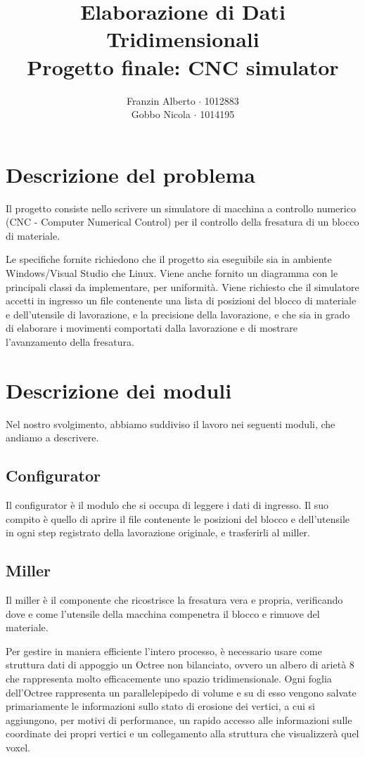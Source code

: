 \documentclass[10pt,a4paper,twoside,openright,titlepage,fleqn,%
               headinclude,,footinclude,BCOR5mm,%
               numbers=noenddot,cleardoublepage=empty,%
               tablecaptionabove]{scrreprt}
\title{Elaborazione di Dati Tridimensionali\\
Progetto finale: CNC simulator}
\author{Franzin Alberto $\cdot$ 1012883\\Gobbo Nicola $\cdot$ 1014195}
\begin{document}
\maketitle

\section{Descrizione del problema}
Il progetto consiste nello scrivere un simulatore di macchina a controllo numerico (CNC - Computer Numerical Control) per il controllo della fresatura di un blocco di materiale.

Le specifiche fornite richiedono che il progetto sia eseguibile sia in ambiente Windows/Visual Studio che Linux. Viene anche fornito un diagramma con le principali classi da implementare, per uniformità. Viene richiesto che il simulatore accetti in ingresso un file contenente una lista di posizioni del blocco di materiale e dell'utensile di lavorazione, e la precisione della lavorazione, e che sia in grado di elaborare i movimenti comportati dalla lavorazione e di mostrare l'avanzamento della fresatura.

\section{Descrizione dei moduli}
Nel nostro svolgimento, abbiamo suddiviso il lavoro nei seguenti moduli, che andiamo a descrivere.

\subsection{Configurator}
Il configurator è il modulo che si occupa di leggere i dati di ingresso. Il suo compito è quello di aprire il file contenente le posizioni del blocco e dell'utensile in ogni step registrato della lavorazione originale, e trasferirli al miller.

\subsection{Miller}
Il miller è il componente che ricostrisce la fresatura vera e propria, verificando dove e come l'utensile della macchina compenetra il blocco e rimuove del materiale.

Per gestire in maniera efficiente l'intero processo, è necessario usare come struttura dati di appoggio un Octree non bilanciato, ovvero un albero di arietà 8 che rappresenta molto efficacemente uno spazio tridimensionale. Ogni foglia dell’Octree rappresenta un parallelepipedo di volume e su di esso vengono salvate primariamente le informazioni sullo stato di erosione dei vertici, a cui si aggiungono, per motivi di performance, un rapido accesso alle informazioni sulle coordinate dei propri vertici e un collegamento alla struttura che visualizzerà quel voxel.
\end{document}
